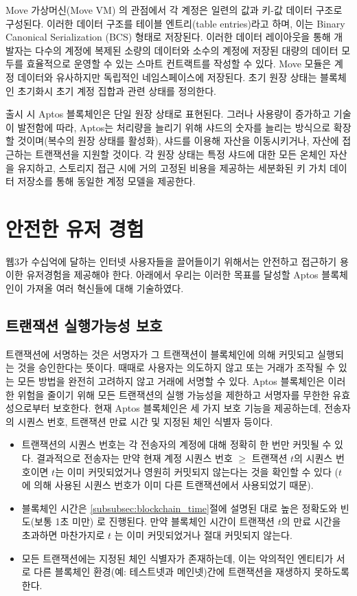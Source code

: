\documentclass{article}
\begin{document}
Move 가상머신(Move VM) 의 관점에서 각 계정은 일련의 값과 키-값 데이터 구조로 구성된다. 이러한 데이터 구조를 테이블 엔트리(table entries)라고 하며, 이는 Binary Canonical Serialization (BCS) 형태로 저장된다. 이러한 데이터 레이아웃을 통해 개발자는 다수의 계정에 복제된 소량의 데이터와 소수의 계정에 저장된 대량의 데이터 모두를 효율적으로 운영할 수 있는 스마트 컨트랙트를 작성할 수 있다. Move 모듈은 계정 데이터와 유사하지만 독립적인 네임스페이스에 저장된다. 초기 원장 상태는 블록체인 초기화시 초기 계정 집합과 관련 상태를 정의한다.

출시 시 Aptos 블록체인은 단일 원장 상태로 표현된다. 그러나 사용량이 증가하고 기술이 발전함에 따라, Aptos는 처리량을 늘리기 위해 샤드의 숫자를 늘리는 방식으로 확장할 것이며(복수의 원장 상태를 활성화), 샤드를 이용해 자산을 이동시키거나, 자산에 접근하는 트랜잭션을 지원할 것이다. 각 원장 상태는 특정 샤드에 대한 모든 온체인 자산을 유지하고, 스토리지 접근 시에 거의 고정된 비용을 제공하는 세분화된 키 가치 데이터 저장소를 통해 동일한 계정 모델을 제공한다.

\section{안전한 유저 경험}
\label{sec:user}

웹3가 수십억에 달하는 인터넷 사용자들을 끌어들이기 위해서는 안전하고 접근하기 용이한 유저경험을 제공해야 한다. 아래에서 우리는 이러한 목표를 달성할 Aptos 블록체인이 가져올 여러 혁신들에 대해 기술하였다.

\subsection{트랜잭션 실행가능성 보호}
\label{subsec:transaction_replay_protection}

트랜잭션에 서명하는 것은 서명자가 그 트랜잭션이 블록체인에 의해 커밋되고 실행되는 것을 승인한다는 뜻이다. 때때로 사용자는 의도하지 않고 또는 거래가 조작될 수 있는 모든 방법을 완전히 고려하지 않고 거래에 서명할 수 있다. Aptos 블록체인은 이러한 위험을 줄이기 위해 모든 트랜잭션의 실행 가능성을 제한하고 서명자를 무한한 유효성으로부터 보호한다. 현재 Aptos 블록체인은 세 가지 보호 기능을 제공하는데, 전송자의 시퀀스 번호, 트랜잭션 만료 시간 및 지정된 체인 식별자 등이다.
\begin{itemize}
    \item 트랜잭션의 시퀀스 번호는 각 전송자의 계정에 대해 정확히 한 번만 커밋될 수 있다. 결과적으로 전송자는 만약 현재 계정 시퀀스 번호  $\geq$ 트랜잭션 $t$의 시퀀스 번호이면 $t$는 이미 커밋되었거나 영원히 커밋되지 않는다는 것을 확인할 수 있다 ($t$ 에 의해 사용된 시퀀스 번호가 이미 다른 트랜잭션에서 사용되었기 때문).
    \item 블록체인 시간은 \ref{subsubsec:blockchain_time}절에 설명된 대로 높은 정확도와 빈도(보통 1초 미만) 로 진행된다. 만약 블록체인 시간이 트랜잭션 $t$의 만료 시간을 초과하면 마찬가지로 $t$ 는 이미 커밋되었거나 절대 커밋되지 않는다.
    \item 모든 트랜잭션에는 지정된 체인 식별자가 존재하는데, 이는 악의적인 엔티티가 서로 다른 블록체인 환경(예: 테스트넷과 메인넷)간에 트랜잭션을 재생하지 못하도록 한다.
\end{itemize}
\end{document}
